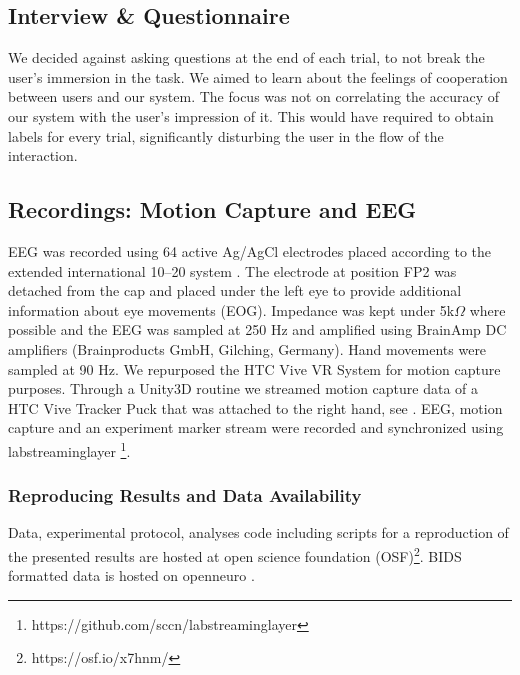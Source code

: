 \subsection{Interview \& Questionnaire}

We decided against asking questions at the end of each trial, to not break the user's immersion in the task. We aimed to learn about the feelings of cooperation between users and our system. The focus was not on correlating the accuracy of our system with the user's impression of it. This would have required to obtain labels for every trial, significantly disturbing the user in the flow of the interaction.


\subsection{Recordings: Motion Capture and EEG}
EEG was recorded using 64 active Ag/AgCl electrodes placed according to the extended international 10–20 system \cite{Chatrian1985-ys}. The electrode at position FP2 was detached from the cap and placed under the left eye to provide additional information about eye movements (EOG). Impedance was kept under 5k$\Omega$ where possible and the EEG was sampled at 250 Hz and amplified using BrainAmp DC amplifiers (Brainproducts GmbH, Gilching, Germany). Hand movements were sampled at 90 Hz. We repurposed the HTC Vive VR System for motion capture purposes. Through a Unity3D routine we streamed motion capture data of a HTC Vive Tracker Puck that was attached to the right hand, see . EEG, motion capture and an experiment marker stream were recorded and synchronized using labstreaminglayer \footnote{https://github.com/sccn/labstreaminglayer}.


\subsubsection{Reproducing Results and Data Availability}
 Data, experimental protocol, analyses code including scripts for a reproduction of the presented results are hosted at open science foundation  (OSF)\footnote{https://osf.io/x7hnm/}. BIDS formatted data is hosted on openneuro \cite{ds003846:1.0.0}.